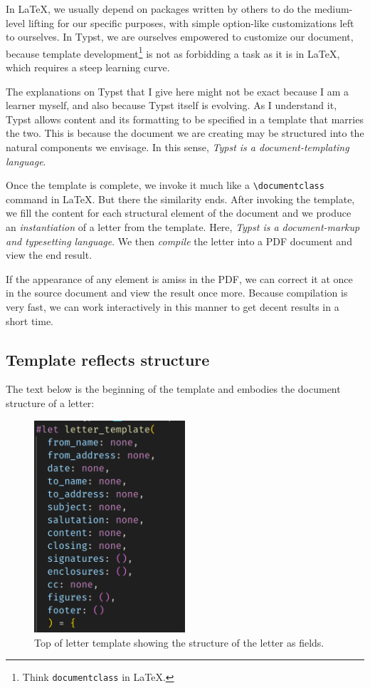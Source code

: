 \documentclass[
  a4paper,
]{article}
\begin{document}
In LaTeX, we usually depend on packages written by others to do the
medium-level lifting for our specific purposes, with simple option-like
customizations left to ourselves. In Typst, we are ourselves empowered
to customize our document, because template development\footnote{Think
  \texttt{documentclass} in LaTeX.} is not as forbidding a task as it is
in LaTeX, which requires a steep learning curve.

The explanations on Typst that I give here might not be exact because I
am a learner myself, and also because Typst itself is evolving. As I
understand it, Typst allows content and its formatting to be specified
in a template that marries the two. This is because the document we are
creating may be structured into the natural components we envisage. In
this sense, \emph{Typst is a document-templating language}.

Once the template is complete, we invoke it much like a
\texttt{\textbackslash{}documentclass} command in LaTeX. But there the
similarity ends. After invoking the template, we fill the content for
each structural element of the document and we produce an
\emph{instantiation} of a letter from the template. Here, \emph{Typst is
a document-markup and typesetting language}. We then \emph{compile} the
letter into a PDF document and view the end result.

If the appearance of any element is amiss in the PDF, we can correct it
at once in the source document and view the result once more. Because
compilation is very fast, we can work interactively in this manner to
get decent results in a short time.

\hypertarget{template-reflects-structure}{%
\subsection{Template reflects
structure}\label{template-reflects-structure}}

The text below is the beginning of the template and embodies the
document structure of a letter:

\begin{figure}
\hypertarget{fig:template}{%
\centering
\includegraphics[width=0.5\textwidth,height=\textheight]{images/letter-template-top.png}
\caption{Top of letter template showing the structure of the letter as
fields.}\label{fig:template}
}
\end{figure}
\end{document}
